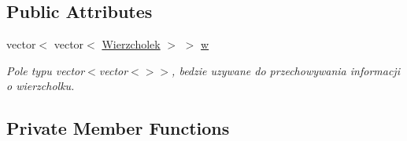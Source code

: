\subsection*{Public Attributes}
\begin{DoxyCompactItemize}
\item 
vector$<$ vector$<$ \hyperlink{struct_wierzcholek}{Wierzcholek} $>$ $>$ \hyperlink{classgraf_a28ea2247c2bbe840ad2ad7f9fa98d596}{w}
\begin{DoxyCompactList}\small\item\em Pole typu vector$<$vector$<$$>$$>$, bedzie uzywane do przechowywania informacji o wierzcholku. \end{DoxyCompactList}\end{DoxyCompactItemize}
\subsection*{Private Member Functions}
